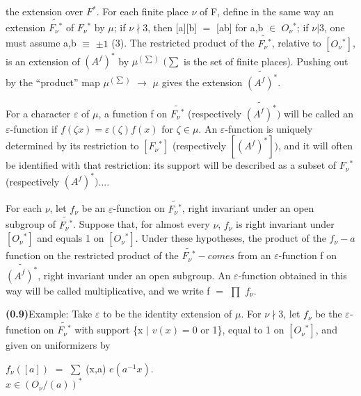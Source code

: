 \documentclass[10pt,a4paper]{article}
\begin{document}
\clearpage
{}
\label{d035-physical-004}
\par the extension over $F^*$. For each finite place $\nu{}$ of F, define in the same way an extension $\widetilde{F_\nu{}^*}$ of $F_\nu{}^*$ by $\mu{}$; if $\nu{}\nmid{}3$, then [a][b] $=$ [ab] for a,b $\in{}$ $O_\nu{}^*$; if $\nu{}|3$, one must assume a,b $\equiv{}$ $\pm{}1$ (3). The restricted product of the $\widetilde{F_\nu{}^*}$, relative to $[O_\nu{}^*]$, is an extension of $(A^f)^*$ by $\mu{}^{(\sum{})}$ $(\sum{}$ is the set of finite places). Pushing out by the ``product'' map $\mu{}^{(\sum{})}$ $\to{}$ $\mu{}$ gives the extension $\widetilde{(A^f)^*}$.\par
\par For a character $\varepsilon{}$ of $\mu{}$, a function f on $\widetilde{F_\nu{}^*}$ (respectively $\widetilde{(A^f)^*})$ will be called an $\varepsilon{}$-function if $f(\zeta{}x)=\varepsilon{}(\zeta{})f(x)$ for $\zeta{}\in{}\mu{}$. An $\varepsilon{}$-function is uniquely determined by its restriction to $[F_\nu{}^*]$ (respectively $[(A^f)^*])$, and it will often be identified with that restriction: its support will be described as a subset of $F_\nu{}^*$ (respectively $(A^f)^*)$....\par
\par For each $\nu{}$, let $f_\nu{}$ be an $\varepsilon{}$-function on $\widetilde{F_\nu{}^*}$, right invariant under an open subgroup of $\widetilde{F_\nu{}^*}$. Suppose that, for almost every $\nu{}$, $f_\nu{}$ is right invariant under $[O_\nu{}^*]$ and equals 1 on $[O_\nu{}^*]$. Under these hypotheses, the product of the $f_\nu{}-a$ function on the restricted product of the $\widetilde{F_\nu{}^*}-comes$ from an $\varepsilon{}$-function f on $\widetilde{(A^f)^*}$, right invariant under an open subgroup. An $\varepsilon{}$-function obtained in this way will be called multiplicative, and we write f $=$ $\prod{}$ $f_\nu{}$.\par
\par\noindent\textbf{(0.9)}\quad Example: Take $\varepsilon{}$ to be the identity extension of $\mu{}$. For $\nu{}\nmid{}3$, let $f_\nu{}$ be the $\varepsilon{}$-function on $\widetilde{F_\nu{}^*}$ with support \{x $|$ $v(x)=0$ or 1\}, equal to 1 on $[O_\nu{}^*]$, and given on uniformizers by\par
\par\smallskip\begin{center}\begin{minipage}{0.96\textwidth}\centering
$f_\nu{}([a])$ $=$ $\sum{}$ (x,a) $e(a^{-1}x)$. \\ $x\in{}(O_\nu{}/(a))^*$
\end{minipage}\end{center}\smallskip
\end{document}
